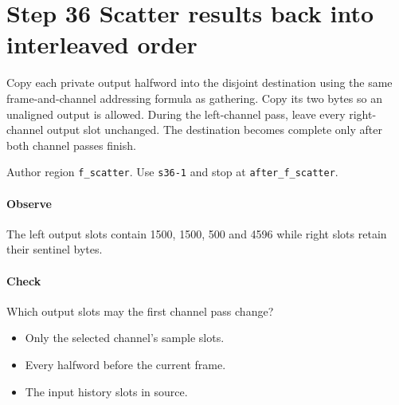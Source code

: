 \section{Step 36 Scatter results back into interleaved order}\label{pcm-wav-s36}
Copy each private output halfword into the disjoint destination using the same frame-and-channel addressing formula as gathering. Copy its two bytes so an unaligned output is allowed. During the left-channel pass, leave every right-channel output slot unchanged. The destination becomes complete only after both channel passes finish.

Author region \texttt{f\_scatter}. Use \texttt{s36-1} and stop at \texttt{after\_f\_scatter}.

\paragraph{Observe} The left output slots contain 1500, 1500, 500 and 4596 while right slots retain their sentinel bytes.

\paragraph{Check} Which output slots may the first channel pass change?
\begin{itemize}
\item[A.] Only the selected channel's sample slots.
\item[B.] Every halfword before the current frame.
\item[C.] The input history slots in source.
\end{itemize}
